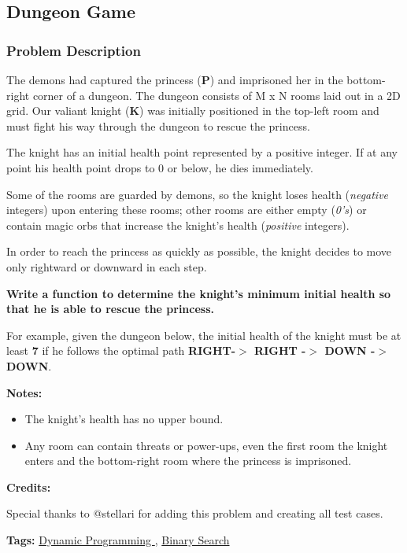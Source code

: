 \documentclass{article}
\begin{document}
\begin{CJK*}{UTF8}{gkai}
\subsection{ Dungeon Game }
\label{ Dungeon Game }

\subsubsection*{Problem Description}
The demons had captured the princess (\textbf{P}) and imprisoned her in the bottom-right corner of a dungeon. The dungeon consists of M x N rooms laid out in a 2D grid. Our valiant knight (\textbf{K}) was initially positioned in the top-left room and must fight his way through the dungeon to rescue the princess.

The knight has an initial health point represented by a positive integer. If at any point his health point drops to 0 or below, he dies immediately.

Some of the rooms are guarded by demons, so the knight loses health (\emph{negative} integers) upon entering these rooms; 
other rooms are either empty (\emph{0's}) or contain magic orbs that increase the knight's health (\emph{positive} integers).

In order to reach the princess as quickly as possible, the knight decides to move only rightward or downward in each step.

\textbf{Write a function to determine the knight's minimum initial health so that he is able to rescue the princess.}

For example, given the dungeon below, the initial health of the knight must be at least \textbf{7} if he follows the optimal path \textbf{RIGHT-$>$ RIGHT -$>$ DOWN -$>$ DOWN}.

\textbf{Notes:}

\begin{itemize}
\item The knight's health has no upper bound.
\item Any room can contain threats or power-ups, even the first room the knight enters and the bottom-right room where the princess is imprisoned.  
\end{itemize}

\textbf{Credits:}

Special thanks to @stellari for adding this problem and creating all test cases.


\textbf{Tags: }
\hyperref[ Dynamic Programming ]{ Dynamic Programming },  \hyperref[ Binary Search ]{ Binary Search }



\end{CJK*}
\end{document}

